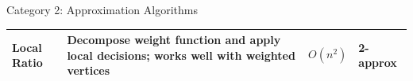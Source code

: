 \documentclass[aspectratio=169]{beamer}
\begin{document}
\begin{frame}{Category 2: Approximation Algorithms}
\begin{table}
\begin{tabular}{@{}p{3.5cm}p{5.5cm}p{2cm}p{1.8cm}@{}}
			\textbf{Local Ratio}                                                                                           &
			Decompose weight function and apply local decisions; works well with weighted vertices                         &
			$O(n^2)$                                                                                                       &
			2-approx                                                                                                                                                                                \\

			\bottomrule
		\end{tabular}
	\end{table}

\end{frame}

\end{document}
